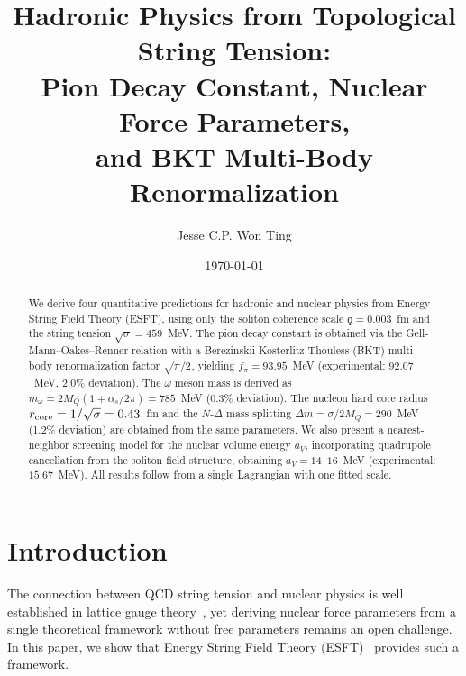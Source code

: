 ﻿\documentclass[twocolumn,showpacs,preprintnumbers,amsmath,amssymb,prc]{revtex4-2}
\begin{document}
\title{Hadronic Physics from Topological String Tension:\\Pion Decay Constant, Nuclear Force Parameters,\\and BKT Multi-Body Renormalization}

\author{Jesse C.P. Won Ting}

\date{\today}

\begin{abstract}
We derive four quantitative predictions for hadronic and nuclear physics from Energy String Field Theory (ESFT), using only the soliton coherence scale $\koppa = 0.003$~fm and the string tension $\sqrt{\sigma} = 459$~MeV. The pion decay constant is obtained via the Gell-Mann--Oakes--Renner relation with a Berezinskii-Kosterlitz-Thouless (BKT) multi-body renormalization factor $\sqrt{\pi/2}$, yielding $f_\pi = 93.95$~MeV (experimental: $92.07$~MeV, 2.0\% deviation). The $\omega$ meson mass is derived as $m_\omega = 2M_Q(1 + \alpha_s/2\pi) = 785$~MeV (0.3\% deviation). The nucleon hard core radius $r_{\rm core} = 1/\sqrt{\sigma} = 0.43$~fm and the $N$-$\Delta$ mass splitting $\Delta m = \sigma/2M_Q = 290$~MeV (1.2\% deviation) are obtained from the same parameters. We also present a nearest-neighbor screening model for the nuclear volume energy $a_V$, incorporating quadrupole cancellation from the soliton field structure, obtaining $a_V = 14$--$16$~MeV (experimental: $15.67$~MeV). All results follow from a single Lagrangian with one fitted scale.
\end{abstract}


\maketitle

\section{Introduction}

The connection between QCD string tension and nuclear physics is well established in lattice gauge theory~\cite{Bali2000}, yet deriving nuclear force parameters from a single theoretical framework without free parameters remains an open challenge. In this paper, we show that Energy String Field Theory (ESFT)~\cite{Paper1,Paper2,Paper3} provides such a framework.
\end{document}
